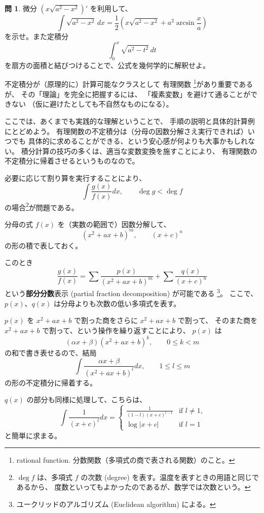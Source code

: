 \documentclass[a4paper]{jsarticle}
\theoremstyle{definition}
\newtheorem{Exercise}{問}%
\theoremstyle{remark}
\begin{document}
\begin{Exercise}
微分 $(x\sqrt{a^2-x^2})'$ を利用して、
\[
\int \sqrt{a^2 - x^2}\,dx = 
\frac{1}{2} \left( x\sqrt{a^2-x^2} + a^2\arcsin \frac{x}{a} \right)
\]
を示せ。また定積分
\[
\int_0^x \sqrt{a^2-t^2}\, dt
\]
を扇方の面積と結びつけることで、公式を幾何学的に解釈せよ。
\end{Exercise}

不定積分が（原理的に）計算可能なクラスとして
有理関数
\footnote{rational function. 分数関数（多項式の商で表される関数）のこと。}があり重要であるが、
その「理論」を完全に把握するには、
「複素変数」を避けて通ることができない
（仮に避けたとしても不自然なものになる）。

ここでは、あくまでも実践的な理解ということで、
手順の説明と具体的計算例にとどめよう。
有理関数の不定積分は（分母の因数分解さえ実行できれば）いつでも
具体的に求めることができる、という安心感が何よりも大事かもしれない。
積分計算の技巧の多くは、適当な変数変換を施すことにより、
有理関数の不定積分に帰着させるというものなので。

\bigskip
\noindent{}

必要に応じて割り算を実行することにより、
\[
\int \frac{g(x)}{f(x)}dx,
\qquad
\deg g < \deg f
\]
の場合\footnote{$\deg f$ は、多項式 $f$ の次数 (degree) を表す。温度を表すときの用語と同じであるから、
度数といってもよかったのであるが、数学では次数という。}が問題である。

分母の式 $f(x)$ を（実数の範囲で）因数分解して、
\[
(x^2 + ax +b)^m,
\qquad
(x+c)^n
\]
の形の積で表しておく。

このとき
\[
\frac{g(x)}{f(x)} = \sum \frac{p(x)}{(x^2 + ax + b)^m} +
\sum \frac{q(x)}{(x+c)^n}
\]
という\textbf{部分分数}表示 (partial fraction decomposition) が可能である
\footnote{ユークリッドのアルゴリズム (Euclidean algorithm) による。}。
ここで、$p(x)$、$q(x)$ は分母よりも次数の低い多項式を表す。

$p(x)$ を $x^2+ax+b$ で割った商をさらに $x^2 + ax+b$ で割って、
そのまた商を $x^2+ax+b$ で割って、という操作を繰り返すことにより、
$p(x)$ は
\[
(\alpha x + \beta)(x^2 + ax + b)^k,
\qquad
0 \leq k < m
\]
の和で書き表せるので、結局
\[
\int \frac{\alpha x+\beta}{(x^2+ax+b)^l}dx,
\qquad
1 \leq l \leq m
\]
の形の不定積分に帰着する。

$q(x)$ の部分も同様に処理して、こちらは、
\[
\int \frac{1}{(x+c)^l}dx =
\begin{cases}
\frac{1}{(1-l)(x+c)^{l-1}} &\text{if $l \not= 1$,}\\
\log |x+c| &\text{if $l=1$}
\end{cases}
\]
と簡単に求まる。
\end{document}
